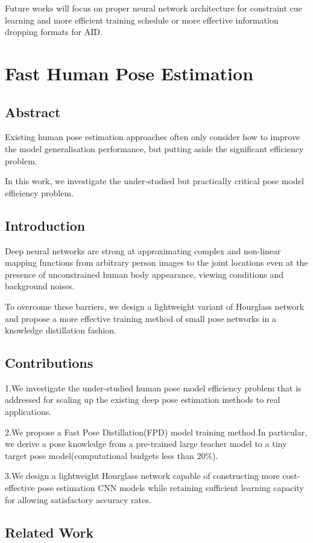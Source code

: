 \documentclass[11pt]{article}
\begin{document}
Future works will focus on proper neural network architecture for constraint cue learning and more efficient training schedule or more effective information dropping formats for AID.
\section{Fast Human Pose Estimation}
\subsection{Abstract}
Existing human pose estimation approaches often only consider how to improve the model generalisation performance, but putting aside the significant efficiency problem.

In this work, we investigate the under-studied but practically critical pose model efficiency problem.

\subsection{Introduction}
Deep neural networks are strong at approximating complex and non-linear mapping functions from arbitrary person images to the joint locations even at the presence of unconstrained human body appearance, viewing conditions and background noises.

To overcome these barriers, we design a lightweight variant of Hourglass network and propose a more effective training method of small pose networks in a knowledge distillation fashion.

\subsection{Contributions}
\noindent1.We investigate the under-studied human pose model efficiency problem that is addressed for scaling up the existing deep pose estimation methods to real applications.

\noindent2.We propose a Fast Pose Distillation(FPD) model training method.In particular, we derive a pose knowledge from a pre-trained large teacher model to a tiny target pose model(computational budgets less than 20\%).

\noindent3.We design a lightweight Hourglass network capable of constructing more cost-effective pose estimation CNN models while retaining sufficient learning capacity for allowing satisfactory accuracy rates.

\subsection{Related Work}
\end{document}
